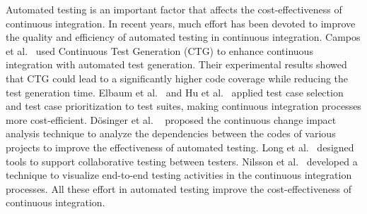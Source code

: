 
Automated testing is an important factor that affects the cost-effectiveness of continuous integration. In recent years, much effort has been devoted to improve the quality and efficiency of automated testing in continuous integration. Campos et al.~\cite{campos2014continuous} used Continuous Test Generation (CTG) to enhance continuous integration with automated test generation. Their experimental results showed that CTG could lead to a significantly higher code coverage while reducing the test generation time. Elbaum et al.~\cite{elbaum2014techniques} and Hu et al.~\cite{hu2016Implementation} applied test case selection and test case prioritization to test suites, making continuous integration processes more cost-efficient. D{\"o}singer et al. ~\cite{dosinger2012communicating} proposed the continuous change impact analysis technique to analyze the dependencies between the codes of various projects to improve the effectiveness of automated testing. Long et al.~\cite{long2015collaborative} designed tools to support collaborative testing between testers. Nilsson et al.~\cite{nilsson2014visualizing} developed a technique to visualize end-to-end testing activities in the continuous integration processes. All these effort in automated testing improve the cost-effectiveness of continuous integration. 